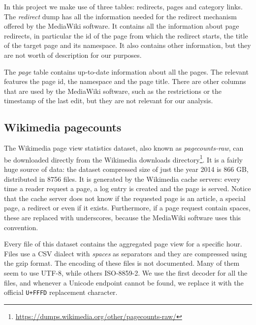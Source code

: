 In this project we make use of three tables: redirects, pages and category links.
The \emph{redirect} dump has all the information needed for the redirect mechanism offered by the MediaWiki software.
It contains all the information about page redirects, in particular the id of the page from which the redirect starts, the title of the target page and its namespace.
It also contains other information, but they are not worth of description for our purposes.

The \emph{page} table contains up-to-date information about all the pages.
The relevant features the page id, the namespace and the page title.
There are other columns that are used by the MediaWiki software, such as the restrictions or the timestamp of the last edit, but they are not relevant for our analysis.


\subsection{Wikimedia pagecounts}
The Wikimedia page view statistics dataset, also known as \emph{pagecounts-raw}, can be downloaded directly from the Wikimedia downloads directory\footnote{\url{https://dumps.wikimedia.org/other/pagecounts-raw/}}.
It is a fairly huge source of data: the dataset compressed size of just the year 2014 is 866 GB, distributed in 8756 files.
It is generated by the Wikimedia cache servers: every time a reader request a page, a log entry is created and the page is served.
Notice that the cache server does not know if the requested page is an article, a special page, a redirect or even if it exists.
Furthermore, if a page request contain spaces, these are replaced with underscores, because the MediaWiki software uses this convention.

Every file of this dataset contains the aggregated page view for a specific hour.
Files use a CSV dialect with \emph{spaces} as separators and they are compressed using the gzip format.
The encoding of these files is not documented.
Many of them seem to use UTF-8, while others ISO-8859-2. %
We use the first decoder for all the files, and whenever a Unicode endpoint cannot be found, we replace it with the official \texttt{U+FFFD} replacement character.

